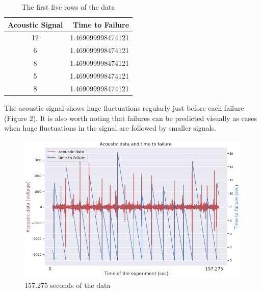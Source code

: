 \documentclass[]{llncs} %
\begin{document}
\begin{table}
	\begin{center}
		\caption{The first five rows of the data}
		\label{tab:SampleData}
		\begin{tabular}{c|r} 
			\textbf{Acoustic Signal} & \textbf{Time to Failure}\\
			\hline
			12 & 1.469099998474121 \\ 
			6 & 1.469099998474121 \\ 
			8 & 1.469099998474121 \\ 
			5 & 1.469099998474121 \\ 
			8 & 1.469099998474121 \\ 
		\end{tabular}
	\end{center}
\end{table}

The acoustic signal shows huge fluctuations regularly just before each failure (Figure 2). It is also worth noting that failures can be predicted visually as cases when huge fluctuations in the signal are followed by smaller signals.\par
\begin{figure}
	\centering
	\includegraphics[width=.9\linewidth]{timeSeries}
	\caption{157.275 seconds of the data}
	\label{fig:timeseries}
\end{figure}
\end{document}
